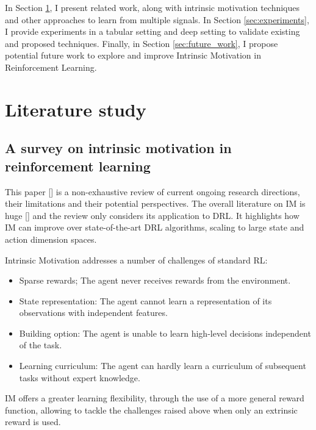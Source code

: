 \documentclass[conference]{IEEEtran}
\begin{document}
In Section \ref{sec:literature_study}, I present related work, along with intrinsic motivation techniques and other approaches to learn from multiple signals. In Section \ref{sec:experiments}, I provide experiments in a tabular setting and deep setting to validate existing and proposed techniques. Finally, in Section \ref{sec:future_work}, I propose potential future work to explore and improve Intrinsic Motivation in Reinforcement Learning.

\section{Literature study} \label{sec:literature_study}

\subsection{A survey on intrinsic motivation in reinforcement learning}

This paper [\cite{aubret2019survey}] is a non-exhaustive review of current ongoing research directions, their limitations and their potential perspectives. The overall literature on IM is huge [\cite{barto2013intrinsic}] and the review only considers its application to DRL. It highlights how IM can improve over state-of-the-art DRL algorithms, scaling to large state and action dimension spaces.

Intrinsic Motivation addresses a number of challenges of standard RL:
\begin{itemize}
    \item Sparse rewards; The agent never receives rewards from the environment.
    \item State representation: The agent cannot learn a representation of its observations with independent features.
    \item Building option: The agent is unable to learn high-level decisions independent of the task.
    \item Learning curriculum: The agent can hardly learn a curriculum of subsequent tasks without expert knowledge.
\end{itemize}

IM offers a greater learning flexibility, through the use of a more general reward function, allowing to tackle the challenges raised above when only an extrinsic reward is used.
\end{document}
